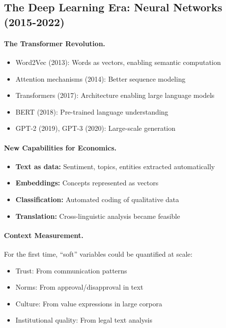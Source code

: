 \documentclass[12pt,a4paper]{article}
\begin{document}
\subsection{The Deep Learning Era: Neural Networks (2015-2022)}

\paragraph{The Transformer Revolution.}
\begin{itemize}
  \item Word2Vec (2013): Words as vectors, enabling semantic computation
  \item Attention mechanisms (2014): Better sequence modeling
  \item Transformers (2017): Architecture enabling large language models
  \item BERT (2018): Pre-trained language understanding
  \item GPT-2 (2019), GPT-3 (2020): Large-scale generation
\end{itemize}

\paragraph{New Capabilities for Economics.}
\begin{itemize}
  \item \textbf{Text as data:} Sentiment, topics, entities extracted automatically
  \item \textbf{Embeddings:} Concepts represented as vectors
  \item \textbf{Classification:} Automated coding of qualitative data
  \item \textbf{Translation:} Cross-linguistic analysis became feasible
\end{itemize}

\paragraph{Context Measurement.}
For the first time, ``soft'' variables could be quantified at scale:
\begin{itemize}
  \item Trust: From communication patterns
  \item Norms: From approval/disapproval in text
  \item Culture: From value expressions in large corpora
  \item Institutional quality: From legal text analysis
\end{itemize}
\end{document}
